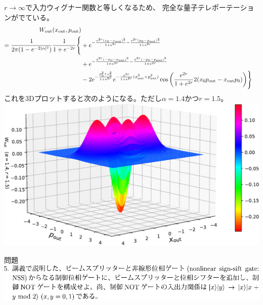 \documentclass{jsarticle}
\newcommand{\mr}[1]{\mathrm{#1}}
\begin{document}
$r \rightarrow \infty$で入力ウィグナー関数と等しくなるため、
完全な量子テレポーテーションがでている。
\begin{align*}
	W_\mr{out}(x_\mr{out}, p_\mr{out}) \\
	= \frac{1}{2\pi (1-e^{-2|\alpha|^2})} \frac{1}{1+e^{-2r}} \Biggl\{
	&+e^{-\frac{e^{2r}(x_0 - x_\mr{out})^2}{1+e^{2r}} -\frac{e^{2r}(p_0 - p_\mr{out})^2}{1+e^{2r}}}\\
	&+ e^{-\frac{e^{2r}(-x_0 - x_\mr{out})^2}{1+e^{2r}} -\frac{e^{2r}(-p_0 - p_\mr{out})^2}{1+e^{2r}}}\\
	&- 2 e^{-\frac{p_0^2 + x_0^2}{1+e^{2r}}} e^{-\frac{e^{2r}}{1+e^{2r}}(x_\mr{out}^2 + p_\mr{out}^2)} \cos \qty( \frac{e^{2r}}{1+e^{2r}} 2(x_0 p_\mr{out} - x_\mr{out} p_0) ) \Biggr\}
\end{align*}
これを3Dプロットすると次のようになる。ただし$\alpha=1.4$かつ$r=1.5$。\\
\includegraphics[width=0.9\linewidth]{./graphics/wigner_cat_tele.pdf}

\begin{itembox}[l]{問題}
	\vspace*{-0mm}
	\centering
	\includegraphics[width=1\linewidth]{./graphics/5.pdf}
\end{itembox}
\end{document}
